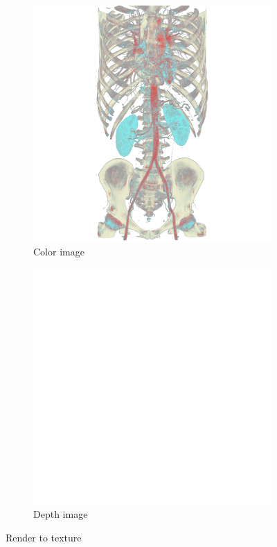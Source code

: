 \begin{figure}[ht]
\centering
  \begin{subfigure}[b]{.5\columnwidth}
    \centering
    \includegraphics[width=\textwidth]{colorimage.png}
    \caption{Color image}
    \label{fig:rendertotexturecolor}
  \end{subfigure}%
  \begin{subfigure}[b]{.5\columnwidth}
    \centering
    \includegraphics[width=\textwidth]{depthimage.png}
    \caption{Depth image}
    \label{fig:rendertotexturedepth}
  \end{subfigure}
  \caption{Render to texture}
  \label{fig:rendertotexture}
\end{figure}


